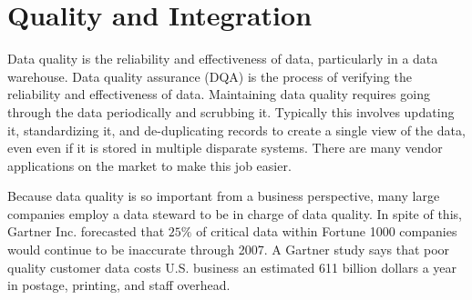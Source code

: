 \section{Quality and Integration}



Data quality is the reliability and effectiveness of data, particularly in a data warehouse. Data quality assurance (DQA) is the process of verifying the reliability and effectiveness of data. Maintaining data quality requires going through the data periodically and scrubbing it. Typically this involves updating it, standardizing it, and de-duplicating records to create a single view of the data, even even if it is stored in multiple disparate systems. There are many vendor applications on the market to make this job easier.

Because data quality is so important from a business perspective, many large companies employ a data steward to be in charge of data quality. In spite of this, Gartner Inc. forecasted that $25\%$ of critical data within Fortune 1000 companies would continue to be inaccurate through 2007. A Gartner study says that poor quality customer data costs U.S. business an estimated 611 billion dollars a year in postage, printing, and staff overhead. 




